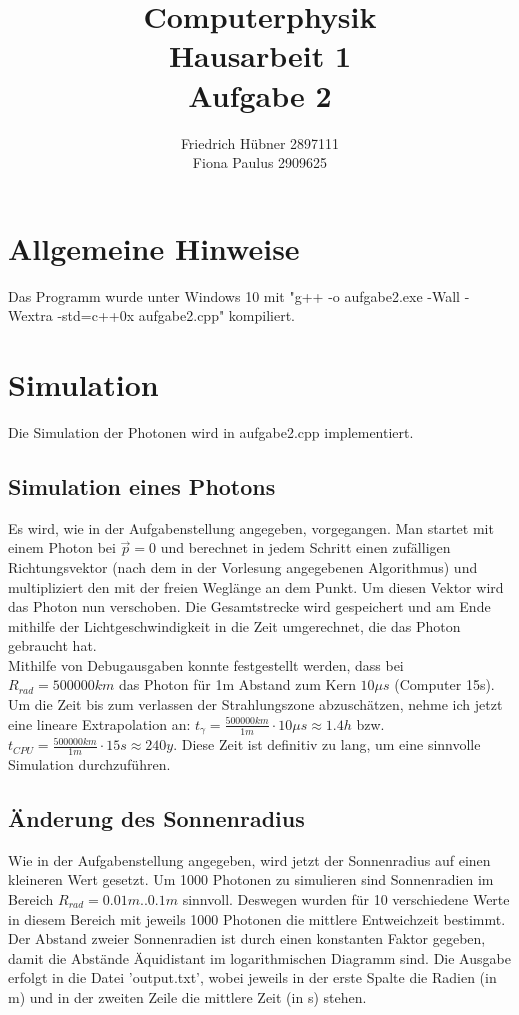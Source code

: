 \documentclass{scrartcl}
\author{Friedrich Hübner 2897111\\
Fiona Paulus 2909625}
\title{Computerphysik\\Hausarbeit 1\\Aufgabe 2}
\begin{document}
\maketitle
\newpage

\section{Allgemeine Hinweise}
Das Programm wurde unter Windows 10 mit "g++ -o aufgabe2.exe -Wall -Wextra -std=c++0x aufgabe2.cpp" kompiliert.

\section{Simulation}
Die Simulation der Photonen wird in aufgabe2.cpp implementiert.
\subsection{Simulation eines Photons}
Es wird, wie in der Aufgabenstellung angegeben, vorgegangen. Man startet mit einem Photon bei $\vec{p} = 0$ und berechnet in jedem Schritt einen zufälligen Richtungsvektor (nach dem in der Vorlesung angegebenen Algorithmus) und multipliziert den mit der freien Weglänge an dem Punkt. Um diesen Vektor wird das Photon nun verschoben. Die Gesamtstrecke wird gespeichert und am Ende mithilfe der Lichtgeschwindigkeit in die Zeit umgerechnet, die das Photon gebraucht hat.\\
Mithilfe von Debugausgaben konnte festgestellt werden, dass bei $R_{rad} = 500000km$ das Photon für 1m Abstand zum Kern $10\mu s$ (Computer 15s). Um die Zeit bis zum verlassen der Strahlungszone abzuschätzen, nehme ich jetzt eine lineare Extrapolation an: $t_\gamma = \frac{500000km}{1m} \cdot 10\mu s \approx 1.4 h$ bzw. $t_{CPU} = \frac{500000km}{1m} \cdot 15s \approx 240y$. Diese Zeit ist definitiv zu lang, um eine sinnvolle Simulation durchzuführen.  

\subsection{Änderung des Sonnenradius}
Wie in der Aufgabenstellung angegeben, wird jetzt der Sonnenradius auf einen kleineren Wert gesetzt. Um 1000 Photonen zu simulieren sind Sonnenradien im Bereich $R_{rad} = 0.01m..0.1m$ sinnvoll. Deswegen wurden für 10 verschiedene Werte in diesem Bereich mit jeweils 1000 Photonen die mittlere Entweichzeit bestimmt. Der Abstand zweier Sonnenradien ist durch einen konstanten Faktor gegeben, damit die Abstände Äquidistant im logarithmischen Diagramm sind. Die Ausgabe erfolgt in die Datei 'output.txt', wobei jeweils in der erste Spalte die Radien (in m) und in der zweiten Zeile die mittlere Zeit (in s) stehen. 
\end{document}
